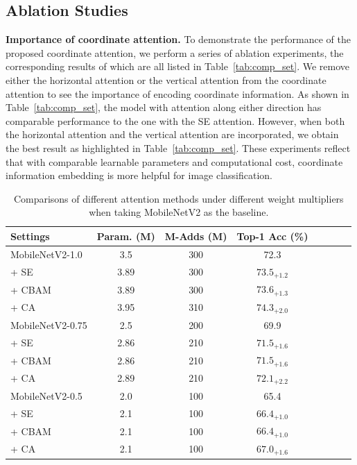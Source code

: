 \documentclass[final]{cvpr}
\newcommand{\myPara}[1]{\vspace{.05in}\noindent\textbf{#1.}}
\begin{document}
\subsection{Ablation Studies}

\myPara{Importance of coordinate attention}
%
To demonstrate the performance of the proposed coordinate
attention, we perform a series of ablation experiments,
the corresponding results of which are all listed 
in Table~\ref{tab:comp_set}.
%
We remove either the horizontal attention
or the vertical attention from the coordinate attention
to see the importance of encoding coordinate information.
%
As shown in Table~\ref{tab:comp_set}, the model with attention
along either direction has comparable performance to
the one with the SE attention.
%
However, when both the horizontal attention
and the vertical attention are incorporated,
we obtain the best result as highlighted in
Table~\ref{tab:comp_set}.
%
These experiments reflect that with comparable
learnable parameters and computational cost,
coordinate information embedding is more helpful
for image classification.

\begin{table}[t]
    \centering
    \small
    \setlength\tabcolsep{1mm}
    \renewcommand{\arraystretch}{1.1}
    \caption{Comparisons of different attention methods under different weight multipliers when taking MobileNetV2 as the baseline. }
    \begin{tabular}{lccccccc} \midrule[1pt]
    Settings & Param. (M) & M-Adds (M) & Top-1 Acc (\%)  \\ \midrule[1pt]
    MobileNetV2-1.0  &   3.5      &  300    &  72.3     \\
    + SE &   3.89      &  300    &  $73.5_{+1.2}$     \\
    + CBAM &   3.89      &  300    &  $73.6_{+1.3}$     \\
    + CA &   3.95 &   310 & $\mathbf{74.3_{+2.0}}$ \\ \midrule[1pt]
    MobileNetV2-0.75  &   2.5      &  200    &  69.9     \\
    + SE &   2.86      &  210    &  $71.5_{+1.6}$     \\
    + CBAM &   2.86      &  210    &  $71.5_{+1.6}$     \\
    + CA &   2.89 &   210 & $\mathbf{72.1_{+2.2}}$ \\ \midrule[1pt]
    MobileNetV2-0.5  &   2.0      &  100    &  65.4     \\
    + SE &   2.1      &  100    &  $66.4_{+1.0}$     \\
    + CBAM &   2.1      &  100    &  $66.4_{+1.0}$     \\
    + CA &   2.1 &   100 & $\mathbf{67.0_{+1.6}}$ \\ \bottomrule[1pt]
    \end{tabular}
    
    \label{tab:mbv2_weight_mult}
\end{table}
\end{document}
